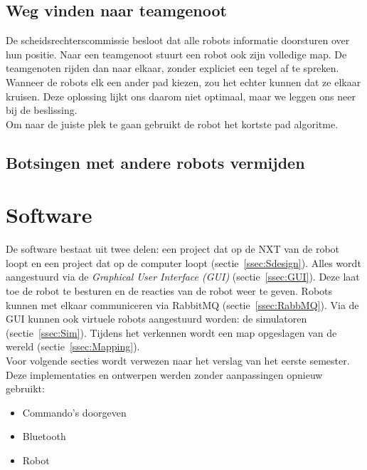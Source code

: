 \documentclass[tt3]{penoverslag}
\begin{document}
\subsection{Weg vinden naar teamgenoot}
\label{ssec:AlgoAndereRobot}
De scheidsrechterscommissie besloot dat alle robots informatie doorsturen over hun positie. Naar een teamgenoot stuurt een robot ook zijn volledige map. De teamgenoten rijden dan naar elkaar, zonder expliciet een tegel af te spreken. Wanneer de robots elk een ander pad kiezen, zou het echter kunnen dat ze elkaar kruisen. Deze oplossing lijkt ons daarom niet optimaal, maar we leggen ons neer bij de beslissing.\\

Om naar de juiste plek te gaan gebruikt de robot het kortste pad algoritme.

\subsection{Botsingen met andere robots vermijden}
\label{ssec:AlgoCollision}


\section{Software}
\label{sec:Softw}
De software bestaat uit twee delen: een project dat op de NXT van de robot loopt en een project dat op de computer loopt (sectie~\ref{ssec:Sdesign}). Alles wordt aangestuurd via de \textit{Graphical User Interface (GUI)} (sectie~\ref{ssec:GUI}). Deze laat toe de robot te besturen en de reacties van de robot weer te geven. Robots kunnen met elkaar communiceren via RabbitMQ (sectie~\ref{ssec:RabbMQ}). Via de GUI kunnen ook virtuele robots aangestuurd worden: de simulatoren (sectie~\ref{ssec:Sim}). Tijdens het verkennen wordt een map opgeslagen van de wereld (sectie~\ref{ssec:Mapping}).\\

Voor volgende secties wordt verwezen naar het verslag van het eerste semester. Deze implementaties en ontwerpen werden zonder aanpassingen opnieuw gebruikt:

\begin{itemize}
\item Commando's doorgeven
\item Bluetooth
\item Robot
\end{itemize}

\end{document}
